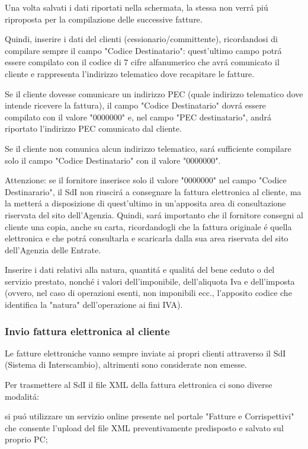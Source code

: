 \documentclass{article}
\begin{document}
Una volta salvati i dati riportati nella schermata, la stessa non verr\'a pi\'u riproposta per la compilazione delle successive fatture. 

Quindi, inserire i dati del clienti (cessionario/committente), ricordandosi di compilare sempre il campo "Codice Destinatario": quest'ultimo campo potr\'a essere compilato con il codice di 7 cifre alfanumerico che avr\'a comunicato il cliente e rappresenta l'indirizzo telematico dove recapitare le fatture. 

Se il cliente dovesse comunicare un indirizzo PEC (quale indirizzo telematico dove intende ricevere la fattura), il campo "Codice Destinatario" dovr\'a essere compilato con il valore "0000000" e, nel campo "PEC destinatario", andr\'a riportato l'indirizzo PEC comunicato dal cliente. 

Se il cliente non comunica alcun indirizzo telematico, sar\'a sufficiente compilare solo il campo "Codice Destinatario" con il valore "0000000".

Attenzione: se il fornitore inserisce solo il valore "0000000" nel campo "Codice Destinarario", il SdI non riuscir\'a a consegnare la fattura elettronica al cliente, ma la metter\'a a disposizione di quest'ultimo in un'apposita area di consultazione riservata del sito dell'Agenzia. Quindi, sar\'a importanto che il fornitore consegni al cliente una copia, anche su carta, ricordandogli che la fattura originale \'e quella elettronica e che potr\'a consultarla e scaricarla dalla sua area riservata del sito dell'Agenzia delle Entrate. 

Inserire i dati relativi alla natura, quantit\'a e qualit\'a del bene ceduto o del servizio prestato, nonch\'e i valori dell'imponibile, dell'aliquota Iva e dell'imposta (ovvero, nel caso di operazioni esenti, non imponibili ecc., l'apposito codice che identifica la "natura" dell'operazione ai fini IVA).

\subsubsection{Invio fattura elettronica al cliente}
Le fatture elettroniche vanno sempre inviate ai propri clienti attraverso il SdI (Sistema di Interscambio), altrimenti sono considerate non emesse. 

Per trasmettere al SdI il file XML della fattura elettronica ci sono diverse modalit\'a:

si pu\'o utilizzare un servizio online presente nel portale "Fatture e Corrispettivi" che consente l'upload del file XML preventivamente predisposto e salvato sul proprio PC;
\end{document}
